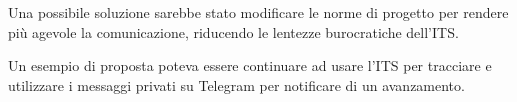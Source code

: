 Una possibile soluzione sarebbe stato modificare le norme di progetto per rendere più agevole la comunicazione, riducendo le lentezze burocratiche dell'ITS.

Un esempio di proposta poteva essere continuare ad usare l'ITS per tracciare e utilizzare i messaggi privati su Telegram per notificare di un avanzamento.
